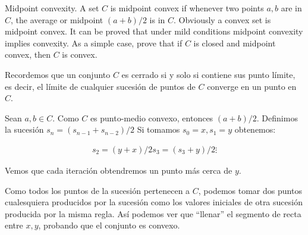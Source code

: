 
\begin{enunciado}{2.3}
Midpoint convexity. A set $C$ is midpoint convex if whenever two points $a, b$ are in $C$, the
average or midpoint $(a + b)/2$ is in $C$. Obviously a convex set is midpoint convex. It can
be proved that under mild conditions midpoint convexity implies convexity. As a simple
case, prove that if $C$ is closed and midpoint convex, then $C$ is convex.
\end{enunciado}

Recordemos que un conjunto $C$ es cerrado si y solo si contiene sus punto límite, es decir,
el límite de cualquier sucesión de puntos de $C$ converge en un punto en $C$.

Sean $a,b \in C$. Como $C$ es punto-medio convexo, entonces $(a + b)/2$.
Definimos la sucesión $s_n = (s_{n-1} + s_{n-2})/2$
Si tomamos $s_0 = x, s_1 = y$ obtenemos:

\begin{align*}
    s_2 = (y + x)/2
    s_3 = (s_3 + y)/2
    \vdots
\end{align*}

Vemos que cada iteración obtendremos un punto más cerca de $y$.

Como todos los puntos de la sucesión pertenecen a $C$, podemos tomar
dos puntos cualesquiera producidos por la sucesión como los
valores iniciales de otra sucesión producida por la misma regla.
Así podemos ver que ``llenar'' el segmento de recta entre $x,y$,
probando que el conjunto es convexo.

